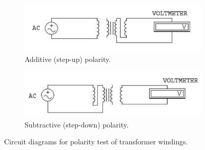 \begin{figure}[H]
    \begin{subfigure}{\textwidth}
        \centering
        \includegraphics[width=.8\linewidth]{images/output/add.png}
        \caption{Additive (step-up) polarity.}
        \label{fig:sfig1}
    \end{subfigure}
    \begin{subfigure}{\textwidth}
        \centering
        \includegraphics[width=.8\linewidth]{images/output/sub.png}
        \caption{Subtractive (step-down) polarity.}
        \label{fig:sfig2}
    \end{subfigure}
    \caption{Circuit diagrams for polarity test of transformer windings.}
    \label{fig:fig}
\end{figure}